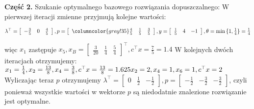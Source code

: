 \documentclass[licencjacka]{pracamgr}
\begin{document}
\textbf{Część 2.} Szukanie optymalnego bazowego rozwiązania dopuszczalnego:\newline
W pierwszej iteracji zmienne przyjmują kolejne wartości:\newline
\centerline{$
\lambda^{\top}=\left[\begin{array}{ccc}-\frac{3}{5}&0&\frac{4}{5}\end{array}\right],
p=\left[\begin{array}{>{\columncolor{gray!35}}ccc}\frac{4}{5}&\frac{1}{5}&\frac{3}{5}\end{array}\right],
y=\left[\begin{array}{ccc}\frac{1}{5}&4&-1\end{array}\right],\theta=\min{\{1,\frac{1}{4}\}}=\frac{1}{4}$}\newline
więc $x_1$ zastępuje $x_5,
x_B=\left[\begin{array}{ccc}\frac{3}{20}&\frac{1}{4}&\frac{5}{4}\end{array}\right]^{\top},c^{\top}x=\frac{7}{5}=1.4$\newline
W kolejnych dwóch iteracjach otrzymujemy:\newline
$
x_1=\frac{1}{4},x_2=\frac{13}{8},x_4=\frac{3}{8},c^{\top}x=\frac{13}{8}=1.625\newline
x_2=2,x_4=1,x_6=1,c^{\top}x=2$\newline
Wyliczając teraz $p$ otrzymujemy $\lambda^{\top}=\left[\begin{array}{ccc}0&\frac{1}{2}&-\frac{1}{2}\end{array}\right],
p=\left[\begin{array}{ccc}-\frac{1}{2}&-\frac{3}{2}&-\frac{3}{2}\end{array}\right]$,\newline
czyli ponieważ wszystkie wartości w wektorze $p$ są niedodatnie znalezione rozwiązanie jest optymalne.\newpage
%
\end{document}
